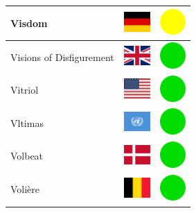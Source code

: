 \documentclass[12pt, a4paper, twoside]{report}
\begin{document}
\begin{center}
\begin{longtable}{|p{5cm}|p{2cm}|p{2cm}|}
 Visdom                                                     & \includegraphics[width=1cm]{../img/flags/de} &   \includegraphics[width=1cm]{../likes/m} \\ \hline
 Visions of Disfigurement                                   & \includegraphics[width=1cm]{../img/flags/gb} &   \includegraphics[width=1cm]{../likes/y} \\ \hline
 Vitriol                                                    & \includegraphics[width=1cm]{../img/flags/us} &   \includegraphics[width=1cm]{../likes/y} \\ \hline
 Vltimas                                                    & \includegraphics[width=1cm]{../img/flags/un} &   \includegraphics[width=1cm]{../likes/y} \\ \hline
 Volbeat                                                    & \includegraphics[width=1cm]{../img/flags/dk} &   \includegraphics[width=1cm]{../likes/y} \\ \hline
 Volière                                                    & \includegraphics[width=1cm]{../img/flags/be} &   \includegraphics[width=1cm]{../likes/y} \\ \hline

\end{longtable}
\end{center}
\end{document}
